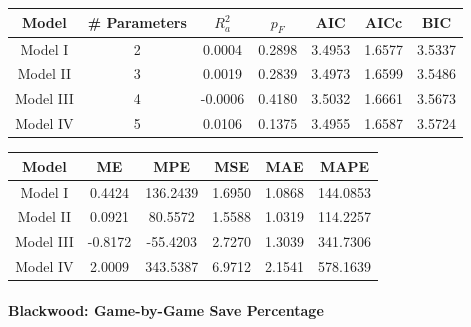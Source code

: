 \documentclass[
  10pt,
]{extarticle}
\begin{document}
\begin{center}
\normalsize

\begin{tabular}{ccccccc}
\toprule
Model & \# Parameters & $R_a^2$ & $p_F$ & AIC & AICc & BIC\\
\midrule
Model I & 2 & 0.0004 & 0.2898 & 3.4953 & 1.6577 & 3.5337\\
Model II & 3 & 0.0019 & 0.2839 & 3.4973 & 1.6599 & 3.5486\\
Model III & 4 & -0.0006 & 0.4180 & 3.5032 & 1.6661 & 3.5673\\
Model IV & 5 & 0.0106 & 0.1375 & 3.4955 & 1.6587 & 3.5724\\
\bottomrule
\end{tabular}
\normalsize
\end{center}
\begin{center}
\normalsize

\begin{tabular}{cccccc}
\toprule
Model & ME & MPE & MSE & MAE & MAPE\\
\midrule
Model I & 0.4424 & 136.2439 & 1.6950 & 1.0868 & 144.0853\\
Model II & 0.0921 & 80.5572 & 1.5588 & 1.0319 & 114.2257\\
Model III & -0.8172 & -55.4203 & 2.7270 & 1.3039 & 341.7306\\
Model IV & 2.0009 & 343.5387 & 6.9712 & 2.1541 & 578.1639\\
\bottomrule
\end{tabular}
\normalsize
\end{center}

\paragraph{Blackwood: Game-by-Game Save Percentage}\label{blackwood-game-by-game-save-percentage}
\end{document}

